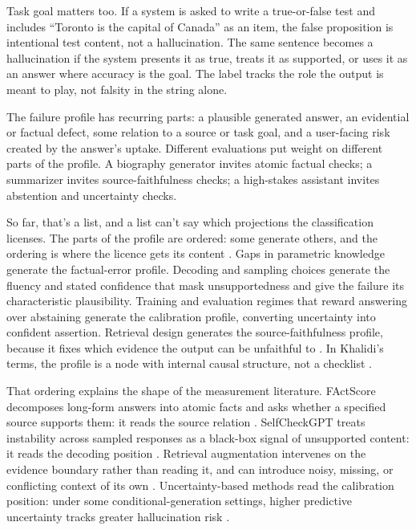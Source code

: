 \documentclass[12pt]{article}
\begin{document}
Task goal matters too. If a system is asked to write a true-or-false test and
includes \enquote{Toronto is the capital of Canada} as an item, the false
proposition is intentional test content, not a hallucination. The same sentence
becomes a hallucination if the system presents it as true, treats it as
supported, or uses it as an answer where accuracy is the goal. The label tracks
the role the output is meant to play, not falsity in the string alone.

The failure profile has
recurring parts: a plausible generated answer, an evidential or factual defect,
some relation to a source or task goal, and a user-facing risk created by the
answer's uptake. Different evaluations put weight on different parts of the
profile. A biography generator invites atomic factual checks; a summarizer
invites source-faithfulness checks; a high-stakes assistant invites abstention
and uncertainty checks.

So far, that's a list, and a list can't say which projections the
classification licenses. The parts of the profile are ordered: some generate
others, and the ordering is where the licence gets its content
\citep{ji2023survey,huang2025survey}. Gaps in parametric knowledge generate the
factual-error profile. Decoding and sampling choices generate the fluency and
stated confidence that mask unsupportedness and give the failure its
characteristic plausibility. Training and evaluation regimes that reward
answering over abstaining generate the calibration profile, converting
uncertainty into confident assertion. Retrieval design generates the
source-faithfulness profile, because it fixes which evidence the output can be
unfaithful to \citep{shuster2021retrieval}. In Khalidi's terms, the profile is
a node with internal causal structure, not a checklist
\citep{khalidi2018causal}.

That ordering explains the shape of the measurement literature. FActScore
decomposes long-form answers into atomic facts and asks whether a specified
source supports them: it reads the source relation \citep{min2023factscore}.
SelfCheckGPT treats instability across sampled responses as a black-box signal
of unsupported content: it reads the decoding position
\citep{manakul2023selfcheckgpt}. Retrieval augmentation intervenes on the
evidence boundary rather than reading it, and can introduce noisy, missing, or
conflicting context of its own \citep{shuster2021retrieval,huang2025survey}.
Uncertainty-based methods read the calibration position: under some
conditional-generation settings, higher predictive uncertainty tracks greater
hallucination risk \citep{xiao2021hallucination}.
\end{document}
